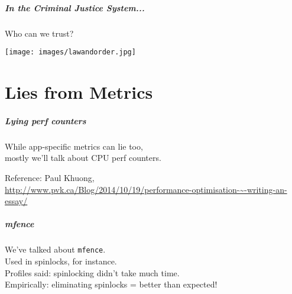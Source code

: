 \begin{frame}
  \frametitle{In the Criminal Justice System...}
  
  
    Who can we trust?\\[1em]
    
    \begin{center}
	\texttt{[image: images/lawandorder.jpg]}
	\end{center}
\end{frame}


\part{Lies from Metrics}

\begin{frame}
  \partpage
\end{frame}

\begin{frame}
  \frametitle{Lying perf counters}
  
  
    While app-specific metrics can lie too,\\
    mostly we'll talk about CPU perf counters.
  

\vspace*{-6em}


  \begin{center}
    Reference: Paul Khuong,\\
  \scriptsize
  \url{http://www.pvk.ca/Blog/2014/10/19/performance-optimisation-~-writing-an-essay/}

  \end{center}

\end{frame}

\begin{frame}
  \frametitle{mfence}


    We've talked about {\tt mfence}.\\
    Used in spinlocks, for instance.\\[2em]
    Profiles said: spinlocking didn't take much time.\\
    Empirically: eliminating spinlocks = better than expected!
    
  
  
\end{frame}


